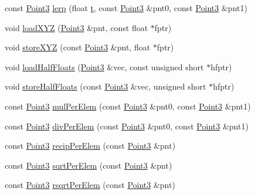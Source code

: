 \begin{DoxyCompactItemize}
const \hyperlink{classVectormath_1_1Aos_1_1Point3}{Point3} \hyperlink{namespaceVectormath_1_1Aos_a4e9504250a9caab66e8b59392b479b04}{lerp} (float \hyperlink{Main_8cpp_a0c8806dd40fb0525e1a3a2a5f78ef88d}{t}, const \hyperlink{classVectormath_1_1Aos_1_1Point3}{Point3} \&pnt0, const \hyperlink{classVectormath_1_1Aos_1_1Point3}{Point3} \&pnt1)
\item 
void \hyperlink{namespaceVectormath_1_1Aos_ab1538c0b75331db3a4b6ac929cb95b36}{load\-X\-Y\-Z} (\hyperlink{classVectormath_1_1Aos_1_1Point3}{Point3} \&pnt, const float $\ast$fptr)
\item 
void \hyperlink{namespaceVectormath_1_1Aos_a7b759d4b0a8fd566882ea78b2fc53948}{store\-X\-Y\-Z} (const \hyperlink{classVectormath_1_1Aos_1_1Point3}{Point3} \&pnt, float $\ast$fptr)
\item 
void \hyperlink{namespaceVectormath_1_1Aos_a9e084b976950637bf8992cc9911f6d5a}{load\-Half\-Floats} (\hyperlink{classVectormath_1_1Aos_1_1Point3}{Point3} \&vec, const unsigned short $\ast$hfptr)
\item 
void \hyperlink{namespaceVectormath_1_1Aos_a7d8a4bd94e45acce2d78b64c6e2adde1}{store\-Half\-Floats} (const \hyperlink{classVectormath_1_1Aos_1_1Point3}{Point3} \&vec, unsigned short $\ast$hfptr)
\item 
const \hyperlink{classVectormath_1_1Aos_1_1Point3}{Point3} \hyperlink{namespaceVectormath_1_1Aos_a8360c3340d6dfead95efb86fcd4d5fc9}{mul\-Per\-Elem} (const \hyperlink{classVectormath_1_1Aos_1_1Point3}{Point3} \&pnt0, const \hyperlink{classVectormath_1_1Aos_1_1Point3}{Point3} \&pnt1)
\item 
const \hyperlink{classVectormath_1_1Aos_1_1Point3}{Point3} \hyperlink{namespaceVectormath_1_1Aos_a50e37d8ade404e9f0cee1a203b09c247}{div\-Per\-Elem} (const \hyperlink{classVectormath_1_1Aos_1_1Point3}{Point3} \&pnt0, const \hyperlink{classVectormath_1_1Aos_1_1Point3}{Point3} \&pnt1)
\item 
const \hyperlink{classVectormath_1_1Aos_1_1Point3}{Point3} \hyperlink{namespaceVectormath_1_1Aos_a0e02379f390d999ffb24115021c51e30}{recip\-Per\-Elem} (const \hyperlink{classVectormath_1_1Aos_1_1Point3}{Point3} \&pnt)
\item 
const \hyperlink{classVectormath_1_1Aos_1_1Point3}{Point3} \hyperlink{namespaceVectormath_1_1Aos_a5cc04a93660ccc16b5677626cb5fe43d}{sqrt\-Per\-Elem} (const \hyperlink{classVectormath_1_1Aos_1_1Point3}{Point3} \&pnt)
\item 
const \hyperlink{classVectormath_1_1Aos_1_1Point3}{Point3} \hyperlink{namespaceVectormath_1_1Aos_a32aa93113bdeba770e7923d9eaf8a1eb}{rsqrt\-Per\-Elem} (const \hyperlink{classVectormath_1_1Aos_1_1Point3}{Point3} \&pnt)

\end{DoxyCompactItemize}
